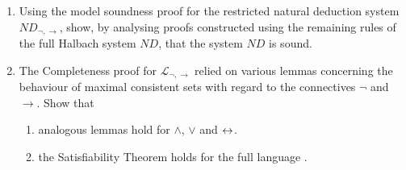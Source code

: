 {\begin{enumerate}
\begin{enumerate}
\begin{equation*}
	\begin{prooftree}
		\phi\oplus\psi \justifies \psi \using\oplus\text{Elim}
	\end{prooftree}\qquad \begin{prooftree}
		\phi \justifies \phi\oplus\psi \using\oplus\text{Intro}
	\end{prooftree}
\end{equation*}

\begin{enumerate}
	\item Show that no system containing a connective defined by these rules is sound. 
	\item What limits should be placed on the ability of introduction and elimination rules to define or characterise the inferential role of a connective in light on this result? (This question invites discussion, not a definitive answer. You may wish to consult \citet{prirunint}.)
	\end{enumerate}
	\item  Relatedly to 1.(d).ii: \label{fouronee}\begin{enumerate}
		\item Check, by means of truth tables, that $(((P\to Q)\to P)\to P)$ is a tautology.	
		\item Give a natural deduction proof of $(((P\to Q)\to P)\to P)$.
		\item Every valid argument involving only sentences containing $\wedge$ as their only connective can be proved valid using just the rules $\wedge$Intro and $\wedge$Elim. In that sense, $\wedge$ is completely characterised by its introduction and elimination rules. What do the previous results show about $\to$ in this connection?
\end{enumerate}
\end{enumerate}
\item Using the model soundness proof for the restricted natural deduction system $ND_{\neg,\to}$, show, by analysing proofs constructed using the remaining rules of the full Halbach system $ND$, that the system $ND$ is sound.
\item The Completeness proof for $\mathcal{L}_{\neg,\to}$ relied on various lemmas concerning the behaviour of maximal consistent sets with regard to  the connectives $\neg$ and $\to$. Show that \begin{enumerate}
	\item analogous lemmas hold for $\wedge$, $\vee$ and $\leftrightarrow$.
	\item the Satisfiability Theorem holds for the full language \lone.

\end{enumerate}
\end{enumerate}}
